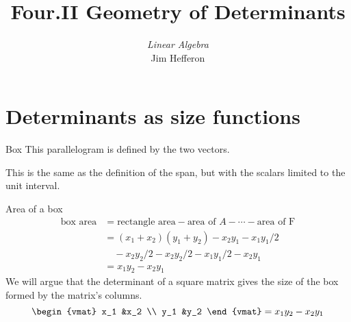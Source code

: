 \documentclass[10pt,t]{beamer}
\title[Geometry of Determinants] %
{Four.II Geometry of Determinants}
\author{\textit{Linear Algebra} \\ {\small Jim Hef{}feron}}
\institute{
  \texttt{http://joshua.smcvt.edu/linearalgebra}
}
\date{}
\begin{document}
\begin{frame}
  \titlepage
\end{frame}




\section{Determinants as size functions}
\begin{frame}{Box}
This parallelogram is defined by the two vectors.

\df[df:Box]

\medskip
This is the same as the definition of the span,
but with the scalars limited to the unit 
interval. 
\end{frame}
\begin{frame}{Area of a box}
\begin{align*}
  \text{box area}
  &=\text{rectangle area}-\text{area of $A$}-\cdots-\text{area of F} \\
  &=(x_1+x_2)(y_1+y_2)-x_2y_1-x_1y_1/2        \\
    &\quad-x_2y_2/2-x_2y_2/2-x_1y_1/2-x_2y_1         \\
  &=x_1y_2-x_2y_1        
\end{align*}
We will argue that
the determinant of a square matrix   
gives the size of the box formed by the matrix's columns.  
\begin{equation*}
  \begin{vmat}
    x_1  &x_2  \\
    y_1  &y_2
  \end{vmat}
  =x_1y_2-x_2y_1
\end{equation*}
\end{frame}
\end{document}
